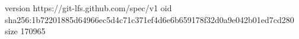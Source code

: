version https://git-lfs.github.com/spec/v1
oid sha256:1b72201885d64966ec5d4c71c371ef4d6e6b659178f32d0a9e042b01ed7cd280
size 170965
